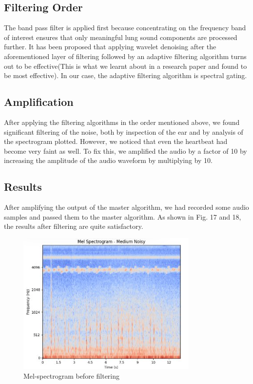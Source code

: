 \documentclass[conference]{IEEEtran}
\begin{document}
\subsection{Filtering Order}
The band pass filter is applied first because concentrating on the frequency band of interest ensures that only
meaningful lung sound components are processed further. It
has been proposed that applying wavelet denoising after the
aforementioned layer of filtering followed by an adaptive filtering algorithm turns out to be effective(This is what we learnt
about in a research paper and found to be most effective). In
our case, the adaptive filtering algorithm is spectral gating.

\subsection{Amplification}
After applying the filtering algorithms in the order mentioned above, we found significant filtering of the noise, both
by inspection of the ear and by analysis of the spectrogram
plotted. However, we noticed that even the heartbeat had
become very faint as well. To fix this, we amplified the
audio by a factor of 10 by increasing the amplitude of the
audio waveform by multiplying by 10.

\subsection{Results}
After amplifying the output of the master algorithm, we had
recorded some audio samples and passed them to the master
algorithm. As shown in Fig. 17 and 18, the results after filtering
are quite satisfactory.

\begin{figure}
    \centering
    \includegraphics[width=0.8\linewidth]{Images/image.png}
    \caption{Mel-spectrogram before filtering}
    \label{fig:before-filtering}
\end{figure}
\end{document}
